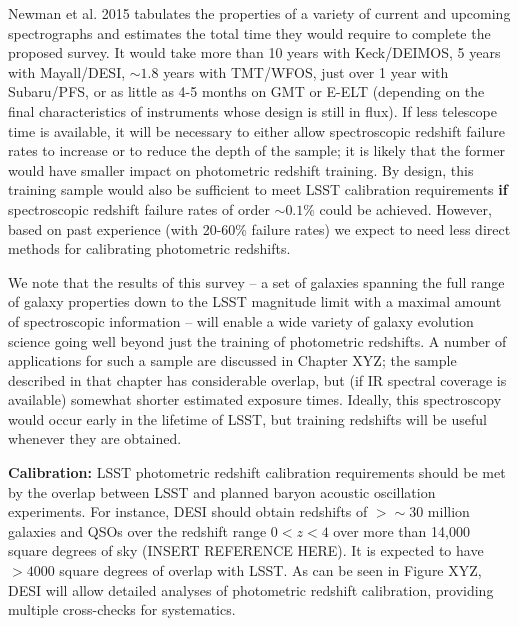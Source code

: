 Newman et al. 2015 tabulates the properties of a variety of current and upcoming spectrographs and estimates the total time they would require to complete the proposed survey.  It would take more than 10 years with Keck/DEIMOS, 5 years with Mayall/DESI,  $\sim1.8$ years with TMT/WFOS, just over 1 year with Subaru/PFS, or as little as 4-5 months on GMT or E-ELT (depending on the final characteristics of instruments whose design is still in flux).  If less telescope time is available, it will be necessary to either allow spectroscopic redshift failure rates to increase or to reduce the depth of the sample; it is likely that the former would have smaller impact on photometric redshift training.  By design, this training sample would also be sufficient to meet LSST calibration requirements {\bf if} spectroscopic redshift failure rates of order $\sim 0.1\%$ could be achieved.  However, based on past experience (with 20-60\% failure rates) we expect to need less direct methods for calibrating photometric redshifts.

We note that the results of this survey -- a set of galaxies spanning the full range of galaxy properties down to the LSST magnitude limit with a maximal amount of spectroscopic information -- will enable a wide variety of galaxy evolution science going well beyond just the training of photometric redshifts.  A number of applications for such a sample are discussed in Chapter XYZ; the sample described in that chapter has considerable overlap, but (if IR spectral coverage is available) somewhat shorter estimated exposure times.  Ideally, this spectroscopy would occur early in the lifetime of LSST, but training redshifts will be useful whenever they are obtained.

{\bf Calibration:} LSST photometric redshift calibration requirements should be met by the overlap between LSST and planned baryon acoustic oscillation experiments.
For instance, DESI should obtain redshifts of $>\sim$30 million galaxies and QSOs over the redshift range $0 < z < 4$ over more than 14,000 square degrees of sky (INSERT REFERENCE HERE).  It is expected to have $>4000$ square degrees of overlap with LSST.
As can be seen in Figure XYZ, DESI will allow detailed analyses of photometric redshift calibration, providing multiple cross-checks for systematics.

